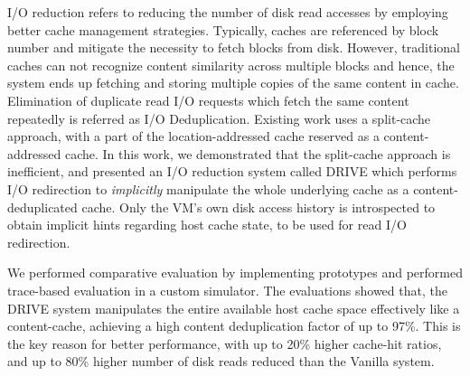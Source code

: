 
I/O reduction refers to reducing the number of disk read accesses by
employing better cache management strategies. Typically, caches are 
referenced by block number and mitigate the necessity to fetch blocks
from disk. However, traditional caches can not recognize content similarity
across multiple blocks and hence, the system ends up fetching and storing 
multiple copies of the same content in cache.
Elimination of duplicate read I/O requests which fetch the same 
content repeatedly is referred as I/O Deduplication.
Existing work uses a split-cache approach, with a part of the location-addressed
cache reserved as a content-addressed cache. In this work, we demonstrated
that the split-cache approach is inefficient, and presented an
I/O reduction system called DRIVE which performs I/O 
redirection to \textit{implicitly} manipulate the whole underlying cache as 
a content-deduplicated cache. Only the VM's own disk access history is
introspected to obtain implicit hints regarding host cache state, to be used
for read I/O redirection.

We performed comparative evaluation by implementing 
prototypes and performed trace-based evaluation in a custom simulator. 
The evaluations showed that, 
the DRIVE system
manipulates the entire available host cache space effectively like
a content-cache, achieving a high content deduplication factor of up to 97\%.
This is the key reason for better performance, with
up to 20\% higher cache-hit ratios,
and up to 80\% higher number of disk reads reduced than the Vanilla system.
